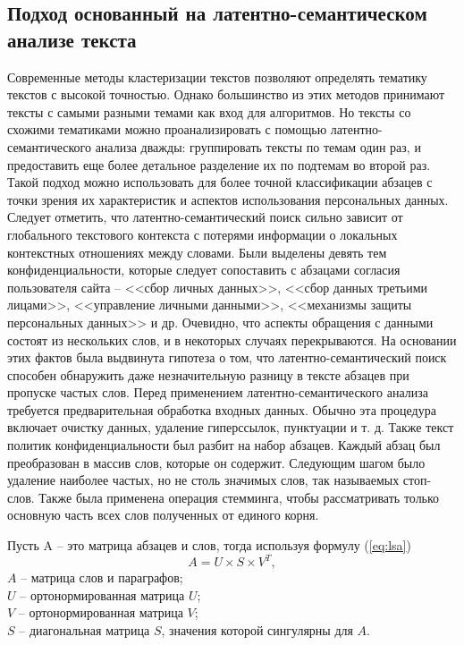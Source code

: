 \documentclass[../main]{subfiles}
\begin{document}
\subsection{Подход основанный на латентно-семантическом анализе текста}

Современные методы кластеризации текстов позволяют определять тематику текстов с высокой точностью. Однако большинство из этих методов принимают тексты с самыми разными темами как вход для алгоритмов. Но тексты со схожими тематиками можно проанализировать с помощью ла\-тен\-тно-семантического анализа дважды: группировать тексты по темам один раз, и предоставить еще более детальное разделение их по подтемам во второй раз. Такой подход можно использовать для более точной классификации абзацев с точки зрения их характеристик и аспектов использования персональных данных. Следует отметить, что латентно-семантический поиск сильно зависит от глобального текстового контекста с потерями информации о локальных контекстных отношениях между словами. Были выделены девять тем конфиденциальности, которые следует сопоставить с абзацами согласия пользователя сайта -- <<сбор личных данных>>, <<сбор данных третьими лицами>>, <<управление личными данными>>, <<механизмы защиты персональных данных>> и др. Очевидно, что аспекты обращения с данными состоят из нескольких слов, и в некоторых случаях перекрываются. На основании этих фактов была выдвинута гипотеза о том, что латентно-семантический поиск способен обнаружить даже незначительную разницу в тексте абзацев при пропуске частых слов. Перед применением латентно-семантического анализа требуется предварительная обработка входных данных. Обычно эта процедура включает очистку данных, удаление гиперссылок, пунктуации и т. д. Также текст политик конфиденциальности был разбит на набор абзацев. Каждый абзац был преобразован в массив слов, которые он содержит. Следующим шагом было удаление наиболее частых, но не столь значимых слов, так называемых стоп-слов. Также была применена операция стемминга, чтобы рассматривать только основную часть всех слов полученных от единого корня.

Пусть A -- это матрица абзацев и слов, тогда используя формулу (\ref{eq:lsa})
\begin{equation}
    \label{eq:lsa}
    A = U \times S \times V^T,
\end{equation}
$A$ -- матрица слов и параграфов;\\
\makebox[12.5mm]{\hfill}$U$ -- ортонормированная матрица $U$;\\
\makebox[12.5mm]{\hfill}$V$ -- ортонормированная матрица $V$;\\
\makebox[12.5mm]{\hfill}$S$ -- диагональная матрица $S$, значения которой сингулярны для $A$.
\end{document}
